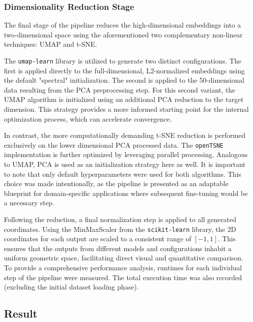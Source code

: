 \subsubsection{Dimensionality Reduction Stage}

The final stage of the pipeline reduces the high-dimensional embeddings into a two-dimensional space using the aforementioned two complementary non-linear techniques: UMAP and t-SNE.

The \texttt{umap-learn} library \cite{mcinnesUMAPUniformManifold2020a} is utilized to generate two distinct configurations. The first is applied directly to the full-dimensional, L2-normalized embeddings using the default "spectral" initialization. The second is applied to the 50-dimensional data resulting from the PCA preprocessing step. For this second variant, the UMAP algorithm is initialized using an additional PCA reduction to the target dimension. This strategy provides a more informed starting point for the internal optimization process, which can accelerate convergence.

In contrast, the more computationally demanding t-SNE reduction is performed exclusively on the lower dimensional PCA processed data. The \texttt{openTSNE} implementation is further optimized by leveraging parallel processing. Analogous to UMAP, PCA is used as an initialization strategy here as well. It is important to note that only default hyperparameters were used for both algorithms. This choice was made intentionally, as the pipeline is presented as an adaptable blueprint for domain-specific applications where subsequent fine-tuning would be a necessary step.

Following the reduction, a final normalization step is applied to all generated coordinates. Using the MinMaxScaler from the \texttt{scikit-learn} \cite{pedregosaScikitlearnMachineLearning2018} library, the 2D coordinates for each output are scaled to a consistent range of $\left[-1,1\right]$. This ensures that the outputs from different models and configurations inhabit a uniform geometric space, facilitating direct visual and quantitative comparison. To provide a comprehensive performance analysis, runtimes for each individual step of the pipeline were measured. The total execution time was also recorded (excluding the initial dataset loading phase).

\subsection{Result}
\label{sec:results}


